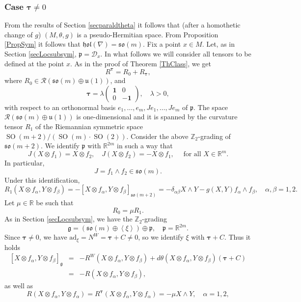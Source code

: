 \documentclass{amsart}
\theoremstyle{plain}
\theoremstyle{definition}
\newcommand{\SO}{\operatorname{SO}}
\def\R{\mathcal{R}}
\def\so{\mathfrak{so}}
\def\u{\mathfrak{u}}
\newcommand{\hol}{\mathfrak{hol}}
\newcommand{\bt}{{\boldsymbol{\tau}}}
\newcommand{\Real}{\mathbb{R}}
\newcommand{\1}{\mathbf{1}}
\newcommand{\ad}{\mathrm{ad}}
\newcommand{\p}{\mathfrak{p}}
\newcommand{\g}{\mathfrak{g}}
\newcommand{\D}{{\mathcal D}}
\newcommand{\+}{\oplus}
\newcommand{\acom}[1]{
 \marginpar{{\scriptsize A: #1 }}}
\begin{document}
\subsubsection{Case $\bt\neq 0$} 
From the results of Section \ref{secparaldtheta} it follows that (after a homothetic change of $g$) $(M,\theta,g)$ is a pseudo-Hermitian space. 
From Proposition \ref{PropSym} it follows that $\hol(\nabla)=\so(m)$.
Fix a point $x\in M$. Let, as in Section \ref{secLocsubsym}, $\p=\D_x$. In what follows we will consider all tensors to be defined at the point $x$.
As in the proof of Theorem \ref{ThClass}, we get
$$R^\bt=R_0+R_\bt,$$ where
$R_0\in\R(\so(m)\oplus\u(1))$, and
$$\bt=\lambda\left( \begin{matrix} \1& 0\\0&-\1\end{matrix}\right),\quad\lambda > 0,$$
with respect to an orthonormal basis $e_1,\dots,e_m,Je_1,\dots, Je_m$ of $\p$.
The space $\R(\so(m)\oplus\u(1))$ is one-dimensional \cite{berger55}  and it is spanned by the curvature tensor $R_1$ of the Riemannian symmetric space $\SO(m+2)/(\SO(m)\cdot\SO(2))$. Consider the above $\mathbb{Z}_2$-grading of $\so(m+2)$. We identify $\p$ with $\Real^{2m}$ in such a way that
$$J(X\otimes f_1)= X\otimes f_2,\quad J(X\otimes f_2)= -X\otimes f_1,\quad \text{ for all }X\in \Real^m.$$
In particular, $$J=f_1\wedge f_2\in\so(m).$$
Under this identification,
$$R_1(X\otimes f_\alpha, Y\otimes f_\beta)=-[X\otimes f_\alpha, Y\otimes f_\beta]_{\so(m+2)}=-\delta_{\alpha\beta} X\wedge Y-g(X,Y) f_\alpha\wedge f_\beta,\quad \alpha,\beta=1,2.$$ Let $\mu\in\Real$ be such that 
$$R_0=\mu R_1.$$
As in Section \ref{secLocsubsym}, we have the 
$\mathbb{Z}_2$-grading
$$\g=(\so(m)\oplus\left<\xi\right>)\oplus \p,\quad \p=\Real^{2m}.$$
Since $\bt\neq 0$, we have $\ad_\xi =N^W=\bt+C\not=0$,  so we identify $\xi$ with $\bt+C$.
Thus it holds %
\begin{equation}\label{bracketgR}
\begin{array}{rcl}
[X\otimes f_\alpha, Y\otimes f_\beta]_\g&=&-R^W(X\otimes f_\alpha, Y\otimes f_\beta)+d\theta(X\otimes f_\alpha, Y\otimes f_\beta)(\bt +C)\\[1mm]
&=&-R(X\otimes f_\alpha, Y\otimes f_\beta),\end{array}\end{equation}
as well as
\begin{equation}\label{RXfaYfa}R(X\otimes f_\alpha, Y\otimes f_\alpha)=R^\bt(X\otimes f_\alpha, Y\otimes f_\alpha)=-\mu X\wedge Y,\quad \alpha=1,2,\end{equation}
\end{document}

